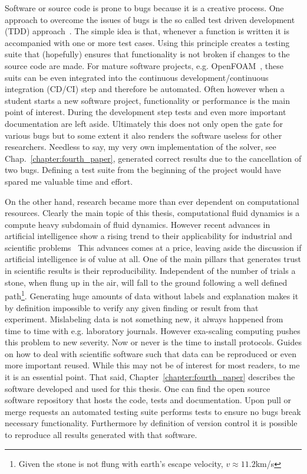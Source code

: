 Software or source code is prone to bugs because it is a creative process.
One approach to overcome the issues of bugs is the so called test driven development (TDD) approach~\cite{beck2003test}.
The simple idea is that, whenever a function is written it is accompanied with one or more test cases.
Using this principle creates a testing suite that (hopefully) ensures that functionality is not broken if changes to the source code are made.
For mature software projects, e.g. OpenFOAM~\cite{jasak2007openfoam, jasak2009openfoam, chen2014openfoam}, these suits can be even integrated into the continuous development/continuous integration (CD/CI) step and therefore be automated.
Often however when a student starts a new software project, functionality or performance is the main point of interest.
During the development step tests and even more important documentation are left aside.
Ultimately this does not only open the gate for various bugs but to some extent it also renders the software useless for other researchers.
Needless to say, my very own implementation of the solver, see Chap.~\ref{chapter:fourth_paper}, generated correct results due to the cancellation of two bugs.
Defining a test suite from the beginning of the project would have spared me valuable time and effort.

On the other hand, research became more than ever dependent on computational resources.
Clearly the main topic of this thesis, computational fluid dynamics is a compute heavy subdomain of fluid dynamics. 
However recent advances in artificial intelligence show a rising trend to their applicability for industrial and scientific problems~\cite{acemoglu20198, doi:10.1080/14685248.2020.1797059}
This advances comes at a price, leaving aside the discussion if artificial intelligence is of value at all.
One of the main pillars that generates trust in scientific results is their reproducibility.
Independent of the number of trials a stone, when flung up in the air, will fall to the ground following a well defined path\footnote{Given the stone is not flung with earth's escape velocity, $v\approx 11.2$km/s}.
Generating huge amounts of data without labels and explanation makes it by definition impossible to verify any given finding or result from that experiment.
Mislabeling data is not something new, it always happened from time to time with e.g. laboratory journals.
However exa-scaling computing pushes this problem to new severity.
Now or never is the time to install protocols. 
Guides on how to deal with scientific software such that data can be reproduced or even more important reused.
While this may not be of interest for most readers, to me it is an essential point.
That said, Chapter~\ref{chapter:fourth_paper} describes the software developed and used for this thesis. 
One can find the open source software repository that hosts the code, tests and documentation.
Upon pull or merge requests an automated testing suite performs tests to ensure no bugs break necessary functionality.
Furthermore by definition of version control it is possible to reproduce all results generated with that software.

